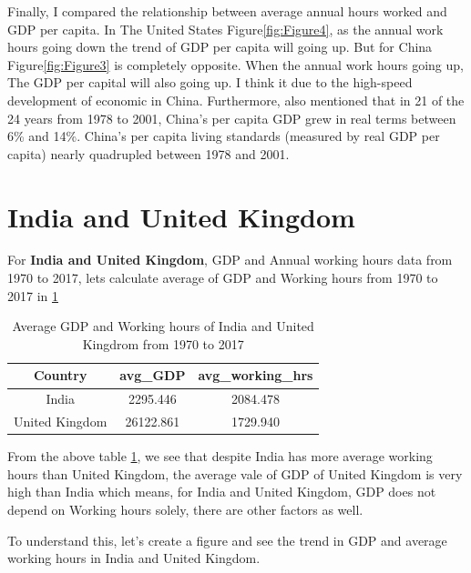 \documentclass[11pt,a4paper,]{article}
\begin{document}
Finally, I compared the relationship between average annual hours worked and GDP per capita. In The United States Figure\ref{fig:Figure4}, as the annual work hours going down the trend of GDP per capita will going up. But for China Figure\ref{fig:Figure3} is completely opposite. When the annual work hours going up, The GDP per capital will also going up. I think it due to the high-speed development of economic in China. Furthermore, \textcite{BANISTER200521} also mentioned that in 21 of the 24 years from 1978 to 2001, China's per capita GDP grew in real terms between 6\% and 14\%. China's per capita living standards (measured by real GDP per capita) nearly quadrupled between 1978 and 2001.

\clearpage

\hypertarget{india-and-united-kingdom}{%
\section{India and United Kingdom}\label{india-and-united-kingdom}}

For \textbf{India and United Kingdom}, GDP and Annual working hours data from 1970 to 2017, lets calculate average of GDP and Working hours from 1970 to 2017 in \ref{tab:TableAvg}

\begin{table}[!h]

\caption{\label{tab:TableAvg}Average GDP and Working hours of India and United Kingdrom from 1970 to 2017}
\centering
\begin{tabular}[t]{c|c|c}
\hline
Country & avg\_GDP & avg\_working\_hrs\\
\hline
India & 2295.446 & 2084.478\\
\hline
United Kingdom & 26122.861 & 1729.940\\
\hline
\end{tabular}
\end{table}

From the above table \ref{tab:TableAvg}, we see that despite India has more average working hours than United Kingdom, the average vale of GDP of United Kingdom is very high than India which means, for India and United Kingdom, GDP does not depend on Working hours solely, there are other factors as well.

To understand this, let's create a figure and see the trend in GDP and average working hours in India and United Kingdom.
\end{document}
